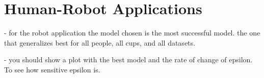 \section{Human-Robot Applications}
\label{sec:robot}

- for the robot application the model chosen is the most successful model. the one that generalizes best for all people, all cups, and all datasets. 

- you should show a plot with the best model and the rate of change of epsilon. To see how sensitive epsilon is. 